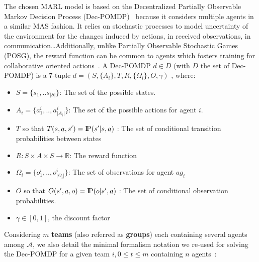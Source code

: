 \documentclass{ecai}
\newcommand{\probP}{\text{I\kern-0.15em P}}
\begin{document}
The chosen MARL model is based on the Decentralized Partially Observable Markov Decision Process (Dec-POMDP)~\citep{Oliehoek2016} because it considers multiple agents in a similar MAS fashion. It relies on stochastic processes to model uncertainty of the environment for the changes induced by actions, in received observations, in communication\dots Additionally, unlike Partially Observable Stochastic Games (POSG), the reward function can be common to agents which fosters training for collaborative oriented actions~\citep{Beynier2013}.
A Dec-POMDP $d \in D$ (with $D$ the set of Dec-POMDP) is a 7-tuple $d = (S,\{A_i\},T,R,\{\Omega_i\},O,\gamma)$ , where:
\begin{itemize}
    \item $S = \{s_1, ..s_{|S|}\}$: The set of the possible states.
    \item $A_{i} = \{a_{1}^{i},..,a_{|A_{i}|}^{i}\}$: The set of the possible actions for agent $i$.
    \item $T$ so that $T(s,a,s') = \probP{(s'|s,a)}$ : The set of conditional transition probabilities between states
    \item $R: S \times A \times S \rightarrow \mathbb{R}$: The reward function
    \item $\Omega_{i} = \{o_{1}^{i},..,o_{|\Omega_{i}|}^{i}\}$: The set of observations for agent $ag_i$
    \item $O$ so that $O(s',a,o) = \probP{(o|s',a)}$ : The set of conditional observation probabilities.
    \item $\gamma \in [0,1]$, the discount factor
\end{itemize}

Considering $m$ \textbf{teams} (also referred as \textbf{groups}) each containing several agents among $\mathcal{A}$, we also detail the minimal formalism notation we re-used for solving the Dec-POMDP for a given team $i, 0 \leq t \leq m$ containing $n$ agents~\citep{Beynier2013,Albrecht2024}:
\end{document}
